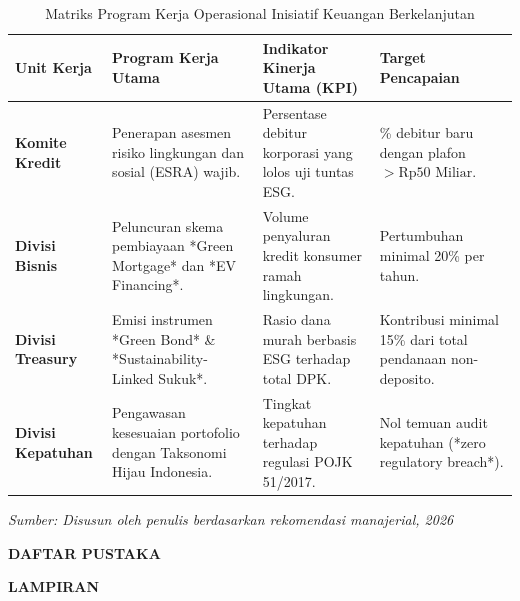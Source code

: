 \documentclass[12pt,a4paper]{article}
\numberwithin{equation}{section}
\begin{document}
\begin{table}[H]
  \caption{Matriks Program Kerja Operasional Inisiatif Keuangan Berkelanjutan}
  \label{tab:program_aksi}
  \small
  \begin{tabularx}{\textwidth}{|>{\raggedright\arraybackslash}p{2.5cm}|>{\raggedright\arraybackslash}X|>{\raggedright\arraybackslash}X|>{\raggedright\arraybackslash}X|}
    \hline
    \textbf{Unit Kerja} & \textbf{Program Kerja Utama} & \textbf{Indikator Kinerja Utama (KPI)} & \textbf{Target Pencapaian} \\
    \hline
    \textbf{Komite Kredit} & Penerapan asesmen risiko lingkungan dan sosial (ESRA) wajib. & Persentase debitur korporasi yang lolos uji tuntas ESG. & 100\% debitur baru dengan plafon $> \text{Rp}50\text{ Miliar}$. \\
    \hline
    \textbf{Divisi Bisnis} & Peluncuran skema pembiayaan *Green Mortgage* dan *EV Financing*. & Volume penyaluran kredit konsumer ramah lingkungan. & Pertumbuhan minimal 20\% per tahun. \\
    \hline
    \textbf{Divisi Treasury} & Emisi instrumen *Green Bond* \& *Sustainability-Linked Sukuk*. & Rasio dana murah berbasis ESG terhadap total DPK. & Kontribusi minimal 15\% dari total pendanaan non-deposito. \\
    \hline
    \textbf{Divisi Kepatuhan} & Pengawasan kesesuaian portofolio dengan Taksonomi Hijau Indonesia. & Tingkat kepatuhan terhadap regulasi POJK 51/2017. & Nol temuan audit kepatuhan (*zero regulatory breach*). \\
    \hline
  \end{tabularx}
  \begin{flushleft}
    \textit{Sumber: Disusun oleh penulis berdasarkan rekomendasi manajerial, 2026}
  \end{flushleft}
\end{table}

\newpage
{}
\begin{center}
  {\large\bfseries DAFTAR PUSTAKA}
\end{center}

\vspace{0.5cm}


\newpage
{}
\begin{center}
  {\large\bfseries LAMPIRAN}
\end{center}
\end{document}
